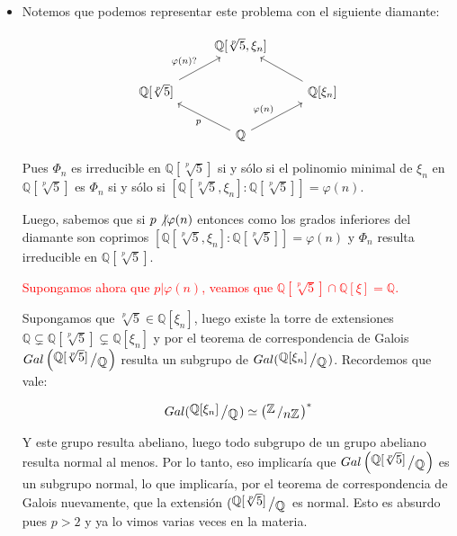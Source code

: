 \documentclass[11pt]{article}
\newcommand{\Q}{\mathbb{Q}}
\newcommand{\Z}{\mathbb{Z}}
\newcommand{\quotient}[2]{{\raisebox{.2em}{$#1$}\left/\raisebox{-.2em}{$#2$}\right.}}
\numberwithin{theorem}{subsection}
\newcommand{\qed}{\nobreak \ifvmode \relax \else
	\ifdim\lastskip<1.5em \hskip-\lastskip
	\hskip1.5em plus0em minus0.5em \fi \nobreak
	\vrule height0.75em width0.5em depth0.25em\fi}
\begin{document}
\begin{enumerate}
\begin{itemize}
		Resumiendo vimos que $f$ es irreducible solo si $K = \Q$. \qed
		
		\item Notemos que podemos representar este problema con el siguiente diamante:
		
		\[
		\begin{tikzcd}
		& \Q[\sqrt[p]{5}, \xi_n] & \\
		\Q[\sqrt[p]{5}] \arrow{ru}{\varphi(n)?}  & & \Q[\xi_n] \arrow{lu} \\ \quad
		& \Q \arrow{ru}{\varphi(n)} \arrow{lu}{p}&
		\end{tikzcd}
		\]
		
		Pues $\Phi_n$ es irreducible en $\Q[\sqrt[p]{5}]$ si y s\'olo si el polinomio minimal de $\xi_n$ en $\Q[\sqrt[p]{5}]$ es $\Phi_n$ si y s\'olo si $[\Q[\sqrt[p]{5}, \xi_n]:\Q[\sqrt[p]{5}]] = \varphi(n)$. 
		
		Luego, sabemos que si $p \not\vert \varphi(n)$ entonces como los grados inferiores del diamante son coprimos $[\Q[\sqrt[p]{5}, \xi_n]:\Q[\sqrt[p]{5}]] = \varphi(n)$ y $\Phi_n$ resulta irreducible en $\Q[\sqrt[p]{5}]$.
		
		\textcolor{red}{Supongamos ahora que $p \vert \varphi(n)$,  veamos que $\Q[\sqrt[p]{5}] \cap \Q[\xi] = \Q$.}
		
		Supongamos que $\sqrt[p]{5} \in \Q[\xi_n]$, luego existe la torre de extensiones $\Q \subsetneq \Q[\sqrt[p]{5}] \subsetneq \Q[\xi_n]$ y por el teorema de correspondencia de Galois $Gal\left(\quotient{ \Q[\sqrt[p]{5}] }{\Q}\right)$ resulta un subgrupo de $Gal(\quotient{\Q[\xi_n]}{\Q})$. Recordemos que vale:
		
		\begin{equation*}
			Gal(\quotient{\Q[\xi_n]}{\Q}) \simeq \left(\quotient{\Z}{n\Z}\right)^*
		\end{equation*}
		
		Y este grupo resulta abeliano, luego todo subgrupo de un grupo abeliano resulta normal al menos. Por lo tanto, eso implicar\'ia que $Gal\left(\quotient{ \Q[\sqrt[p]{5}] }{\Q}\right)$ es un subgrupo normal, lo que implicar\'ia, por el teorema de correspondencia de Galois nuevamente, que la extensi\'on $(\quotient{ \Q[\sqrt[p]{5}] }{\Q}$ es normal. Esto es absurdo pues $p > 2$ y ya lo vimos varias veces en la materia. 
		

\end{itemize}
\end{enumerate}
\end{document}
